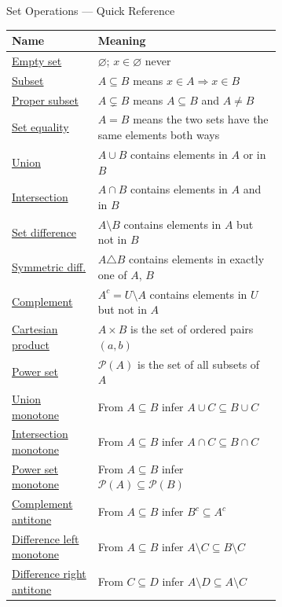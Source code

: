 \begin{toolkitbox}{Set Operations --- Quick Reference}
\small
\begin{tabular}{l p{0.68\linewidth}}
\toprule
\textbf{Name}  & \textbf{Meaning} \\
\midrule
\hyperref[def:empty-set]{Empty set}         & $\varnothing$; $x \in \varnothing$ never \\
\hyperref[def:subset]{Subset}            & $A \subseteq B$ means $x \in A \Rightarrow x \in B$ \\
\hyperref[def:proper-subset]{Proper subset}     & $A \subsetneq B$ means $A \subseteq B$ and $A \neq B$ \\
\hyperref[def:set-equality]{Set equality}      & $A = B$ means the two sets have the same elements both ways \\
\hyperref[def:union]{Union}             & $A \cup B$ contains elements in $A$ or in $B$ \\
\hyperref[def:intersection]{Intersection}      & $A \cap B$ contains elements in $A$ and in $B$ \\
\hyperref[def:set-difference]{Set difference}    & $A \setminus B$ contains elements in $A$ but not in $B$ \\
\hyperref[def:sym-diff]{Symmetric diff.}   & $A \triangle B$ contains elements in exactly one of $A$, $B$ \\
\hyperref[def:complement]{Complement}        & $A^c = U \setminus A$ contains elements in $U$ but not in $A$ \\
\hyperref[def:cartesian-product]{Cartesian product} & $A \times B$ is the set of ordered pairs $(a,b)$ \\
\hyperref[def:power-set]{Power set}         & $\mathcal{P}(A)$ is the set of all subsets of $A$ \\
\hyperref[thm:union-monotone-inclusion]{Union monotone} & From $A\subseteq B$ infer $A\cup C\subseteq B\cup C$ \\
\hyperref[thm:intersection-monotone-inclusion]{Intersection monotone} & From $A\subseteq B$ infer $A\cap C\subseteq B\cap C$ \\
\hyperref[thm:power-set-monotone-inclusion]{Power set monotone} & From $A\subseteq B$ infer $\mathcal{P}(A)\subseteq\mathcal{P}(B)$ \\
\hyperref[thm:complement-antitone-inclusion]{Complement antitone} & From $A\subseteq B$ infer $B^c\subseteq A^c$ \\
\hyperref[thm:set-difference-monotone-left]{Difference left monotone} & From $A\subseteq B$ infer $A\setminus C\subseteq B\setminus C$ \\
\hyperref[thm:set-difference-antitone-right]{Difference right antitone} & From $C\subseteq D$ infer $A\setminus D\subseteq A\setminus C$ \\
\bottomrule
\end{tabular}
\end{toolkitbox}


